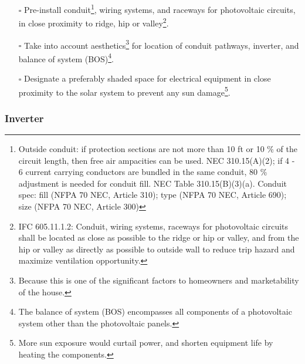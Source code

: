 \documentclass[]{article}
\providecommand{\tightlist}{%
  \setlength{\itemsep}{0pt}\setlength{\parskip}{0pt}}
\let\rmarkdownfootnote\footnote%
\def\footnote{\protect\rmarkdownfootnote}
\begin{document}
\begin{itemize}
\tightlist
\item[$\square$]
  Pre-install conduit\footnote{Outside conduit: if protection sections
    are not more than 10 ft or 10 \% of the circuit length, then free
    air ampacities can be used. NEC 310.15(A)(2); if 4 - 6 current
    carrying conductors are bundled in the same conduit, 80 \%
    adjustment is needed for conduit fill. NEC Table 310.15(B)(3)(a).
    Conduit spec: fill (NFPA 70 NEC, Article 310); type (NFPA 70 NEC,
    Article 690); size (NFPA 70 NEC, Article 300)}, wiring systems, and
  raceways for photovoltaic circuits, in close proximity to ridge, hip
  or valley\footnote{IFC 605.11.1.2: Conduit, wiring systems, raceways
    for photovoltaic circuits shall be located as close as possible to
    the ridge or hip or valley, and from the hip or valley as directly
    as possible to outside wall to reduce trip hazard and maximize
    ventilation opportunity.}.
\item[$\square$]
  Take into account aesthetics\footnote{Because this is one of the
    significant factors to homeowners and marketability of the house.}
  for location of conduit pathways, inverter, and balance of system
  (BOS)\footnote{The balance of system (BOS) encompasses all components
    of a photovoltaic system other than the photovoltaic panels.}.
\item[$\square$]
  Designate a preferably shaded space for electrical equipment in close
  proximity to the solar system to prevent any sun damage\footnote{More
    sun exposure would curtail power, and shorten equipment life by
    heating the components.}.
\end{itemize}

\hypertarget{inverter}{%
\subsubsection{Inverter}\label{inverter}}
\end{document}
